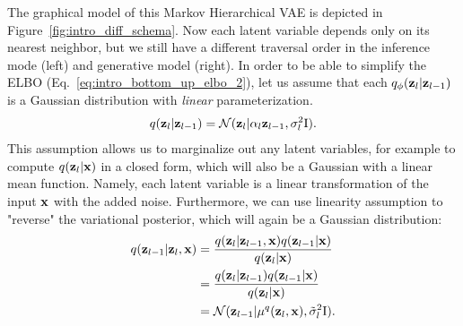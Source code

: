 The graphical model of this Markov Hierarchical VAE is depicted in Figure~\ref{fig:intro_diff_schema}. Now each latent variable depends only on its nearest neighbor, but we still have a different traversal order in the inference mode (left) and generative model (right). In order to be able to simplify the ELBO (Eq.~\ref{eq:intro_bottom_up_elbo_2}), let us assume that each $q_{\phi}({\mathbf{z}}_l|{\mathbf{z}}_{l-1})$ is a Gaussian distribution with \textit{linear} parameterization. 
\begin{equation}
\begin{aligned}\label{eq:intro_forward_diff_def}
    q(\rvz_l|\rvz_{l-1}) = \mathcal{N}(\rvz_l | \alpha_l \rvz_{l-1}, \sigma_l^2\text{I}).
\end{aligned}
\end{equation}
This assumption allows us to marginalize out any latent variables, for example to compute $q({\mathbf{z}}_l|{\mathbf{x}})$ in a closed form, which will also be a Gaussian with a linear mean function. Namely, each latent variable is a linear transformation of the input ${\mathbf{x}}$ with the added noise.
 Furthermore, we can use linearity assumption to "reverse" the variational posterior, which will again be a Gaussian distribution:
\begin{align}
q(\rvz_{l-1} |\rvz_l, \rvx) &= \frac{q(\rvz_l|\rvz_{l-1}, \rvx)q(\rvz_{l-1}|\rvx)}{q(\rvz_l|\rvx)}\\
&= \frac{q(\rvz_l|\rvz_{l-1})q(\rvz_{l-1}|\rvx)}{q(\rvz_l|\rvx)} \\
& = \mathcal{N}(\rvz_{l-1} | \mu^q(\rvz_l, \rvx), \tilde{\sigma}^2_l\text{I}).\label{eq:intro_diff_q_form}
\end{align}
